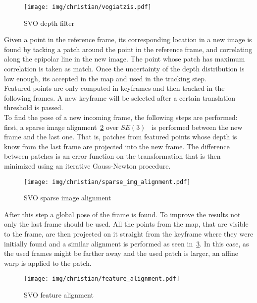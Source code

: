 \begin{figure}[htpb]
  \centering
  \texttt{[image: img/christian/vogiatzis.pdf]}
  \caption{SVO depth filter \cite{Forster2014}}
  \label{fig:depth_filter}
\end{figure}

Given a point in the reference frame, its corresponding location in a new image is found by tacking a patch around the point in the reference frame, and correlating along the epipolar line in the new image. The point whose patch has maximum correlation is taken as match. Once the uncertainty of the depth distribution is low enough, its accepted in the map and used in the tracking step.\\

Featured points are only computed in keyframes and then tracked in the following frames. A new keyframe will be selected after a certain translation threshold is passed.\\

To find the pose of a new incoming frame, the following steps are performed: first, a sparse image alignment~\ref{fig:svo_img_alig} over $SE(3)$~\cite{Strasdat2012} is performed between the new frame and the last one. That is, patches from featured points whose depth is know from the last frame are projected into the new frame. The difference between patches is an error function on the transformation that is then minimized using an iterative Gauss-Newton procedure.\\

\begin{figure}[htpb]
  \centering
  \texttt{[image: img/christian/sparse\_img\_alignment.pdf]}
  \caption{SVO sparse image alignment \cite{Forster2014}}
  \label{fig:svo_img_alig}
\end{figure}

After this step a global pose of the frame is found. To improve the results not only the last frame should be used. All the points from the map, that are visible to the frame, are then projected on it straight from the keyframe where they were initially found and a similar alignment is performed as seen in~\ref{fig:svo_feature_align}. In this case, as the used frames might be farther away and the used patch is larger, an affine warp is applied to the patch. \\

\begin{figure}[htpb]
  \centering
  \texttt{[image: img/christian/feature\_alignment.pdf]}
  \caption{SVO feature alignment \cite{Forster2014}}
  \label{fig:svo_feature_align}
\end{figure}

